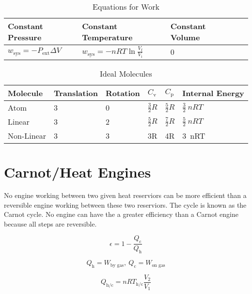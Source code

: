 \documentclass{article}
\begin{document}
\begin{table}[h]
\centering
\caption{Equations for Work}
\label{my-label}
\def\arraystretch{1.5}
\begin{tabular}{|l|l|l|l|l|}
\hline
Constant Pressure & Constant Temperature & Constant Volume   \\
\hline
$w_\text{sys} = - P_{\text{ext}} \Delta V$   & $w_\text{sys} = - n R T\ln{\frac{V_\text{f}}{V_\text{i}}}$ & 0 \\
\hline
\end{tabular}
\end{table}

\begin{table}[h!]
\centering
\caption{Ideal Molecules}
\label{my-label}
\def\arraystretch{1.5}
\begin{tabular}{|l|l|l|l|l|l|}
\hline
Molecule & Translation & Rotation & $C_\text{v}$ & $C_\text{p}$ & Internal Energy  \\
\hline
Atom & 3 & 0 & $\frac{3}{2}R$ & $\frac{5}{2}R$ & $\frac{3}{2}\ nRT$\\
\hline
Linear & 3 & 2 & $\frac{5}{2}R$& $\frac{7}{2}R$ & $\frac{5}{2}\ nRT$\\
\hline
Non-Linear & 3 & 3 & 3R & 4R & 3\ nRT\\
\hline
\end{tabular}
\end{table}

\section{Carnot/Heat Engines}

No engine working between two given heat reserviors can be more efficient than a reversible engine working between these two reserviors. The cycle is known as the Carnot cycle. No engine can have the a greater efficiency than a Carnot engine because all steps are reversible.

\begin{equation*}
\epsilon = 1 - \frac{Q_\text{c}}{Q_\text{h}}
\end{equation*}

\begin{equation*}
Q_\text{h} = W_\text{by gas},\ Q_\text{c} = W_\text{on gas} 
\end{equation*}

\begin{equation*}
Q_\text{h/c} = nRT_\text{h/c} \frac{V_\text{2}}{V_\text{1}}
\end{equation*}
\end{document}
